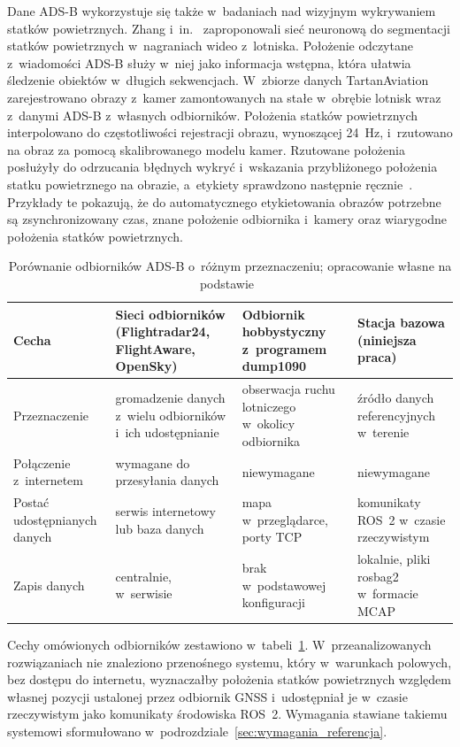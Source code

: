 Dane ADS-B wykorzystuje się także w~badaniach nad wizyjnym wykrywaniem statków powietrznych. Zhang i~in.~\cite{zhang2022sta} zaproponowali sieć neuronową do segmentacji statków powietrznych w~nagraniach wideo z~lotniska. Położenie odczytane z~wiadomości ADS-B służy w~niej jako informacja wstępna, która ułatwia śledzenie obiektów w~długich sekwencjach. W~zbiorze danych TartanAviation~\cite{patrikar2025tartan} zarejestrowano obrazy z~kamer zamontowanych na stałe w~obrębie lotnisk wraz z~danymi ADS-B z~własnych odbiorników. Położenia statków powietrznych interpolowano do częstotliwości rejestracji obrazu, wynoszącej \SI{24}{\hertz}, i~rzutowano na obraz za pomocą skalibrowanego modelu kamer. Rzutowane położenia posłużyły do odrzucania błędnych wykryć i~wskazania przybliżonego położenia statku powietrznego na obrazie, a~etykiety sprawdzono następnie ręcznie~\cite{patrikar2025tartan}. Przykłady te pokazują, że do automatycznego etykietowania obrazów potrzebne są zsynchronizowany czas, znane położenie odbiornika i~kamery oraz wiarygodne położenia statków powietrznych.

\begin{table}[htbp]
  \centering
  \caption{Porównanie odbiorników ADS-B o~różnym przeznaczeniu; opracowanie własne na podstawie~\cite{fr24build,piaware,schafer2014,dump1090}}
  \label{tab:rozwiazania}
  \small
  \begin{tabular}{@{}>{\raggedright\arraybackslash}p{2.8cm}>{\raggedright\arraybackslash}p{3.9cm}>{\raggedright\arraybackslash}p{3.9cm}>{\raggedright\arraybackslash}p{3.9cm}@{}}
    \toprule
    Cecha & Sieci odbiorników (Flightradar24, FlightAware, OpenSky) & Odbiornik hobbystyczny z~programem dump1090 & Stacja bazowa (niniejsza praca) \\
    \midrule
    Przeznaczenie & gromadzenie danych z~wielu odbiorników i~ich udostępnianie & obserwacja ruchu lotniczego w~okolicy odbiornika & źródło danych referencyjnych w~terenie \\
    \addlinespace
    Połączenie z~internetem & wymagane do przesyłania danych & niewymagane & niewymagane \\
    \addlinespace
    Postać udostępnianych danych & serwis internetowy lub baza danych & mapa w~przeglądarce, porty TCP & komunikaty ROS~2 w~czasie rzeczywistym \\
    \addlinespace
    Zapis danych & centralnie, w~serwisie & brak w~podstawowej konfiguracji & lokalnie, pliki rosbag2 w~formacie MCAP \\
    \bottomrule
  \end{tabular}
\end{table}

Cechy omówionych odbiorników zestawiono w~tabeli~\ref{tab:rozwiazania}. W~przeanalizowanych rozwiązaniach nie znaleziono przenośnego systemu, który w~warunkach polowych, bez dostępu do internetu, wyznaczałby położenia statków powietrznych względem własnej pozycji ustalonej przez odbiornik GNSS i~udostępniał je w~czasie rzeczywistym jako komunikaty środowiska ROS~2. Wymagania stawiane takiemu systemowi sformułowano w~podrozdziale~\ref{sec:wymagania_referencja}.
